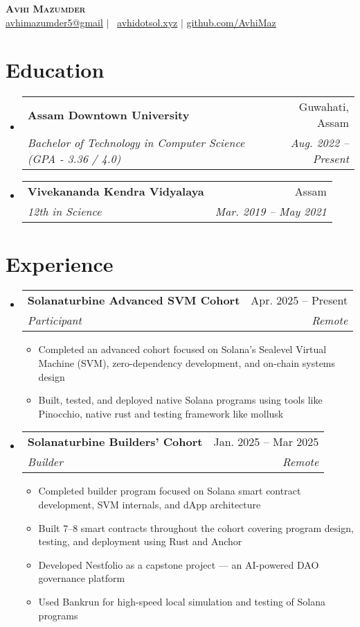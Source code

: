 \documentclass[letterpaper,11pt]{article}
\makeatletter
\newcommand{\resumeItem}[1]{
  \item\small{
    {#1 \vspace{-2pt}}
  }
}
\newcommand{\resumeSubheading}[4]{
  \vspace{-2pt}\item
    \begin{tabular*}{0.97\textwidth}[t]{l@{\extracolsep{\fill}}r}
      \textbf{#1} & #2 \\
      \textit{\small#3} & \textit{\small #4} \\
    \end{tabular*}\vspace{-7pt}
}
\newcommand{\resumeSubHeadingListStart}{\begin{itemize}[leftmargin=0.15in, label={}]}
\newcommand{\resumeSubHeadingListEnd}{\end{itemize}}
\newcommand{\resumeItemListStart}{\begin{itemize}}
\newcommand{\resumeItemListEnd}{\end{itemize}\vspace{-5pt}}
\makeatother
\begin{document}
\begin{center}
    \textbf{\Huge \scshape Avhi Mazumder} \\ \vspace{1pt}
    \small\href{mailto:avhimazumder5@gmail.com}{\underline{avhimazumder5@gmail}} $|$ \
    \href{https://avhidotsol.xyz/}{\underline{avhidotsol.xyz}} $|$
    \href{https://github.com/AvhiMaz}{\underline{github.com/AvhiMaz}}
\end{center}


\section{Education}
  \resumeSubHeadingListStart
    \resumeSubheading
      {Assam Downtown University}{Guwahati, Assam}
      {Bachelor of Technology in Computer Science (GPA - 3.36 / 4.0)}{Aug. 2022 -- Present}
    \resumeSubheading
      {Vivekananda Kendra Vidyalaya}{Assam}
      {12th in Science}{Mar. 2019 -- May 2021}
  \resumeSubHeadingListEnd


\section{Experience}
  \resumeSubHeadingListStart

    \resumeSubheading
      {Solanaturbine Advanced SVM Cohort}{Apr. 2025 -- Present}
      {Participant}{Remote}
      \resumeItemListStart
        \resumeItem{Completed an advanced cohort focused on Solana's Sealevel Virtual Machine (SVM), zero-dependency development, and on-chain systems design}
        \resumeItem{Built, tested, and deployed native Solana programs using tools like Pinocchio, native rust and testing framework like mollusk}
      \resumeItemListEnd
    \resumeSubheading
      {Solanaturbine Builders' Cohort}{Jan. 2025 -- Mar 2025}
      {Builder}{Remote}
    \resumeItemListStart
      \resumeItem{Completed builder program focused on Solana smart contract development, SVM internals, and dApp architecture}
      \resumeItem{Built 7–8 smart contracts throughout the cohort covering program design, testing, and deployment using Rust and Anchor}
      \resumeItem{Developed Nestfolio as a capstone project — an AI-powered DAO governance platform}
      \resumeItem{Used Bankrun for high-speed local simulation and testing of Solana programs}
    \resumeItemListEnd
  \resumeSubHeadingListEnd


\end{document}
